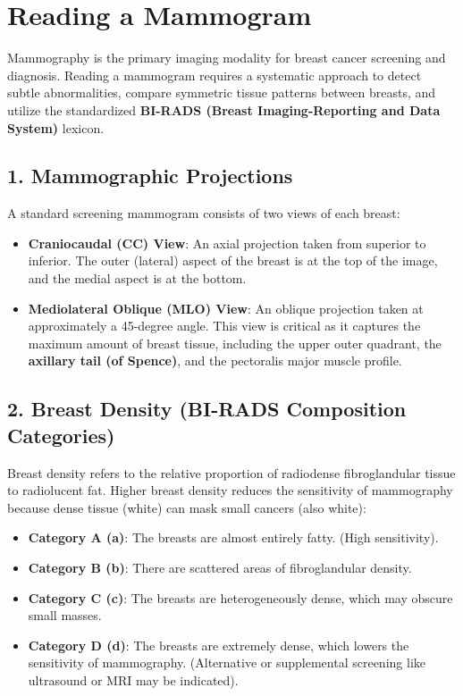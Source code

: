 \chapter{Reading a Mammogram}

\label{ch:read_mammogram}

Mammography is the primary imaging modality for breast cancer screening and diagnosis. Reading a mammogram requires a systematic approach to detect subtle abnormalities, compare symmetric tissue patterns between breasts, and utilize the standardized \textbf{BI-RADS (Breast Imaging-Reporting and Data System)} lexicon.


\section*{1. Mammographic Projections}
A standard screening mammogram consists of two views of each breast:
\begin{itemize}
    \item \textbf{Craniocaudal (CC) View}: An axial projection taken from superior to inferior. The outer (lateral) aspect of the breast is at the top of the image, and the medial aspect is at the bottom.
    \item \textbf{Mediolateral Oblique (MLO) View}: An oblique projection taken at approximately a 45-degree angle. This view is critical as it captures the maximum amount of breast tissue, including the upper outer quadrant, the \textbf{axillary tail (of Spence)}, and the pectoralis major muscle profile.
\end{itemize}


\section*{2. Breast Density (BI-RADS Composition Categories)}
Breast density refers to the relative proportion of radiodense fibroglandular tissue to radiolucent fat. Higher breast density reduces the sensitivity of mammography because dense tissue (white) can mask small cancers (also white):

\begin{itemize}
    \item \textbf{Category A (a)}: The breasts are almost entirely fatty. (High sensitivity).
    \item \textbf{Category B (b)}: There are scattered areas of fibroglandular density.
    \item \textbf{Category C (c)}: The breasts are heterogeneously dense, which may obscure small masses.
    \item \textbf{Category D (d)}: The breasts are extremely dense, which lowers the sensitivity of mammography. (Alternative or supplemental screening like ultrasound or MRI may be indicated).
\end{itemize}


